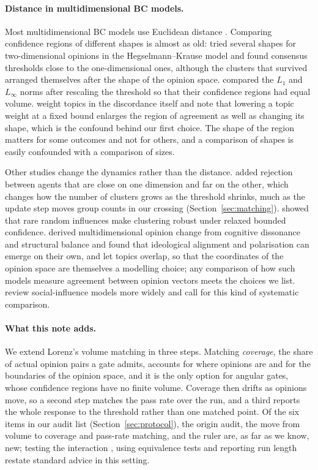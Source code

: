 \documentclass[11pt]{article}
\begin{document}
\paragraph{Distance in multidimensional BC models.}
Most multidimensional BC models use Euclidean distance \citep{lorenz2007}.
Comparing confidence regions of different shapes is almost as old: \citet{fortunato2005} tried several shapes for two-dimensional opinions in the Hegselmann--Krause model and found consensus thresholds close to the one-dimensional ones, although the clusters that survived arranged themselves after the shape of the opinion space.
\citet{lorenz2008} compared the $L_1$ and $L_\infty$ norms after rescaling the threshold so that their confidence regions had equal volume.
\citet{li2026} weight topics in the discordance itself and note that lowering a topic weight at a fixed bound enlarges the region of agreement as well as changing its shape, which is the confound behind our first choice.
The shape of the region matters for some outcomes and not for others, and a comparison of shapes is easily confounded with a comparison of sizes.

Other studies change the dynamics rather than the distance.
\citet{huet2008} added rejection between agents that are close on one dimension and far on the other, which changes how the number of clusters grows as the threshold shrinks, much as the update step moves group counts in our crossing (Section~\ref{sec:matching}).
\citet{kurahashi2016} showed that rare random influences make clustering robust under relaxed bounded confidence.
\citet{schweighofer2020} derived multidimensional opinion change from cognitive dissonance and structural balance and found that ideological alignment and polarisation can emerge on their own, and \citet{baumann2021} let topics overlap, so that the coordinates of the opinion space are themselves a modelling choice; any comparison of how such models measure agreement between opinion vectors meets the choices we list.
\citet{flache2017} review social-influence models more widely and call for this kind of systematic comparison.

\paragraph{What this note adds.}
We extend Lorenz's volume matching in three steps.
Matching \emph{coverage}, the share of actual opinion pairs a gate admits, accounts for where opinions are and for the boundaries of the opinion space, and it is the only option for angular gates, whose confidence regions have no finite volume.
Coverage then drifts as opinions move, so a second step matches the pass rate over the run, and a third reports the whole response to the threshold rather than one matched point.
Of the six items in our audit list (Section~\ref{sec:protocol}), the origin audit, the move from volume to coverage and pass-rate matching, and the ruler are, as far as we know, new; testing the interaction \citep{gelman2006}, using equivalence tests \citep{lakens2017} and reporting run length restate standard advice in this setting.
\end{document}
